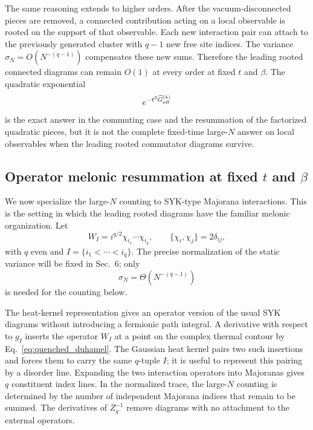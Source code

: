 \documentclass{article}
\theoremstyle{definition}
\begin{document}
The same reasoning extends to higher orders. After the vacuum-disconnected pieces are removed, a connected contribution acting on a local observable is rooted on the support of that observable. Each new interaction pair can attach to the previously generated cluster with $q-1$ new free site indices. The variance $\sigma_N=O(N^{-(q-1)})$ compensates these new sums. Therefore the leading rooted connected diagrams can remain $O(1)$ at every order at fixed $t$ and $\beta$. The quadratic exponential
\begin{equation}
    e^{-t^2\widehat G_{\rm eff}^{(k)}}
\end{equation}
is the exact answer in the commuting case and the resummation of the factorized quadratic pieces, but it is not the complete fixed-time large-$N$ answer on local observables when the leading rooted commutator diagrams survive.

\subsection{Operator melonic resummation at fixed $t$ and $\beta$}
\label{subsec:quenched_syk_gaussian_regulator}

We now specialize the large-$N$ counting to SYK-type Majorana interactions. This is the setting in which the leading rooted diagrams have the familiar melonic organization. Let
\begin{equation}
    W_I=i^{q/2}\chi_{i_1}\cdots\chi_{i_q},
    \qquad
    \{\chi_i,\chi_j\}=2\delta_{ij},
\end{equation}
with $q$ even and $I=\{i_1<\cdots<i_q\}$. The precise normalization of the static variance will be fixed in Sec.~6; only
\begin{equation}
    \sigma_N=\Theta(N^{-(q-1)})
\end{equation}
is needed for the counting below.

The heat-kernel representation gives an operator version of the usual SYK diagrams without introducing a fermionic path integral. A derivative with respect to $g_I$ inserts the operator $W_I$ at a point on the complex thermal contour by Eq.~\eqref{eq:quenched_duhamel}. The Gaussian heat kernel pairs two such insertions and forces them to carry the same $q$-tuple $I$; it is useful to represent this pairing by a disorder line. Expanding the two interaction operators into Majoranas gives $q$ constituent index lines. In the normalized trace, the large-$N$ counting is determined by the number of independent Majorana indices that remain to be summed. The derivatives of $Z_g^{-1}$ remove diagrams with no attachment to the external operators.
\end{document}
